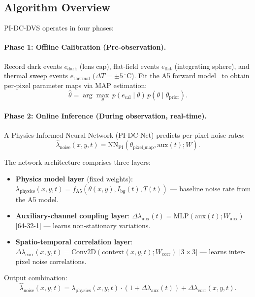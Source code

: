 \documentclass[12pt]{article}
\begin{document}
\subsection{Algorithm Overview}

PI-DC-DVS operates in four phases:

\paragraph{Phase 1: Offline Calibration (Pre-observation).}
Record dark events $e_\mathrm{dark}$ (lens cap), flat-field events $e_\mathrm{flat}$ (integrating sphere), and thermal sweep events $e_\mathrm{thermal}$ ($\Delta T = \pm5\,^\circ$C).
Fit the A5 forward model~\cite{A5} to obtain per-pixel parameter maps via MAP estimation:
\begin{equation}
  \hat{\theta} = \arg\max_\theta\, p(e_\mathrm{cal} \mid \theta)\, p(\theta \mid \theta_\mathrm{prior}).
\end{equation}

\paragraph{Phase 2: Online Inference (During observation, real-time).}
A Physics-Informed Neural Network (PI-DC-Net) predicts per-pixel noise rates:
\begin{equation}
  \hat{\lambda}_\mathrm{noise}(x,y,t) = \mathrm{NN}_\mathrm{PI}(\theta_\mathrm{pixel\_map}, \mathrm{aux}(t); W).
\end{equation}

The network architecture comprises three layers:
\begin{itemize}
  \item \textbf{Physics model layer} (fixed weights): $\lambda_\mathrm{physics}(x,y,t) = f_\mathrm{A5}(\theta(x,y), I_\mathrm{bg}(t), T(t))$ --- baseline noise rate from the A5 model.
  \item \textbf{Auxiliary-channel coupling layer}: $\Delta\lambda_\mathrm{aux}(t) = \mathrm{MLP}(\mathrm{aux}(t); W_\mathrm{aux})$ [64-32-1] --- learns non-stationary variations.
  \item \textbf{Spatio-temporal correlation layer}: $\Delta\lambda_\mathrm{corr}(x,y,t) = \mathrm{Conv2D}(\mathrm{context}(x,y,t); W_\mathrm{corr})$ [$3\times3$] --- learns inter-pixel noise correlations.
\end{itemize}

Output combination:
\begin{equation}
  \hat{\lambda}_\mathrm{noise}(x,y,t) = \lambda_\mathrm{physics}(x,y,t) \cdot (1 + \Delta\lambda_\mathrm{aux}(t)) + \Delta\lambda_\mathrm{corr}(x,y,t).
\end{equation}
\end{document}
